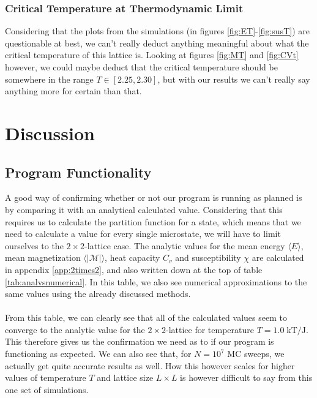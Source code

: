 \documentclass[reprint,english,notitlepage]{revtex4-1}  %
\begin{document}
\newpage

\subsubsection{Critical Temperature at Thermodynamic Limit}

Considering that the plots from the simulations (in figures \ref{fig:ET}-\ref{fig:susT}) are questionable at best, we can't really deduct anything meaningful about what the critical temperature of this lattice is. Looking at figures \ref{fig:MT} and \ref{fig:CVt} however, we could maybe deduct that the critical temperature should be somewhere in the range $T \in [2.25,2.30]$, but with our results we can't really say anything more for certain than that.

\newpage

\section{Discussion}

\subsection{Program Functionality}

A good way of confirming whether or not our program is running as planned is by comparing it with an analytical calculated value. Considering that this requires us to calculate the partition function for a state, which means that we need to calculate a value for every single microstate, we will have to limit ourselves to the $2\times2$-lattice case. The analytic values for the mean energy $\langle E \rangle$, mean magnetization $\langle \mathcal{|M|}\rangle$, heat capacity $C_v$ and susceptibility $\chi$ are calculated in appendix \ref{app:2times2}, and also written down at the top of table \ref{tab:analvsnumerical}. In this table, we also see numerical approximations to the same values using the already discussed methods. 
\\
\\
From this table, we can clearly see that all of the calculated values seem to converge to the analytic value for the $2\times2$-lattice for temperature $T = 1.0\;\text{kT/J}$. This therefore gives us the confirmation we need as to if our program is functioning as expected. We can also see that, for $N = 10^7$ MC sweeps, we actually get quite accurate results as well. How this however scales for higher values of temperature $T$ and lattice size $L\times L$ is however difficult to say from this one set of simulations.
\end{document}
